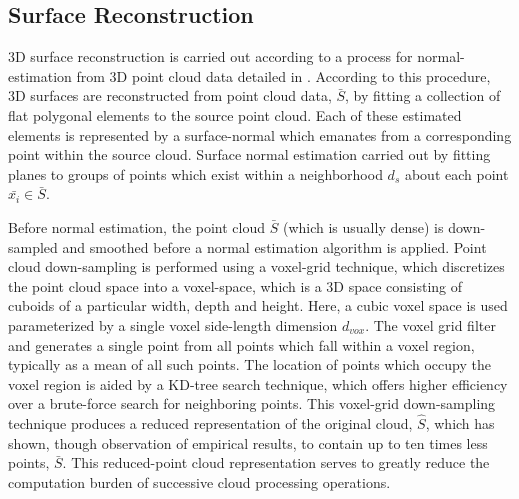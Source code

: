 		\subsection{Surface Reconstruction}

			3D surface reconstruction is carried out according to a process for normal-estimation from 3D point cloud data detailed in \cite{Rusu2009}. According to this procedure, 3D surfaces are reconstructed from point cloud data, $\bar{S}$, by fitting a collection of flat polygonal elements to the source point cloud. Each of these estimated elements is represented by a surface-normal which emanates from a corresponding point within the source cloud. Surface normal estimation carried out by fitting planes to groups of points which exist within a neighborhood $d_{s}$ about each point $\bar{x_{i}}\in\bar{S}$.

			Before normal estimation, the point cloud $\bar{S}$ (which is usually dense) is down-sampled and smoothed before a normal estimation algorithm is applied. Point cloud down-sampling is performed using a voxel-grid technique, which discretizes the point cloud space into a voxel-space, which is a 3D space consisting of cuboids of a particular width, depth and height. Here, a cubic voxel space is used parameterized by a single voxel side-length dimension $d_{vox}$. The voxel grid filter and generates a single point from all points which fall within a voxel region, typically as a mean of all such points. The location of points which occupy the voxel region is aided by a KD-tree search technique, which offers higher efficiency over a brute-force search for neighboring points. This voxel-grid down-sampling technique produces a reduced representation of the original cloud, $\hat{S}$, which has shown, though observation of empirical results, to contain up to ten times less points, $\bar{S}$. This reduced-point cloud representation serves to greatly reduce the computation burden of successive cloud processing operations.

